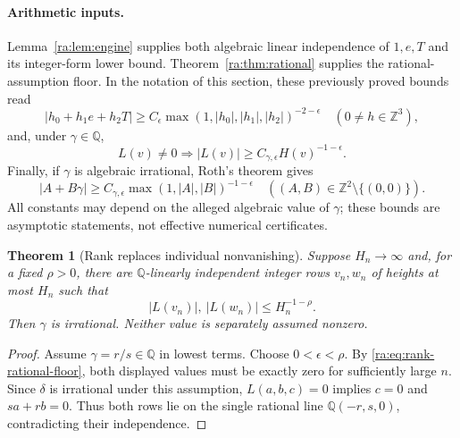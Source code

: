\documentclass[11pt,a4paper]{article}
\newcommand{\Q}{\mathbb Q}
\newcommand{\Z}{\mathbb Z}
\newtheorem{theorem}{Theorem}[section]
\theoremstyle{definition}
\theoremstyle{remark}
\theoremstyle{plain}
\numberwithin{equation}{section}
\begin{document}
\paragraph{Arithmetic inputs.}
Lemma~\ref{ra:lem:engine} supplies both algebraic linear independence of
$1,e,T$ and its integer-form lower bound. Theorem~\ref{ra:thm:rational}
supplies the rational-assumption floor. In the notation of this section,
these previously proved bounds read
\begin{equation}\label{ra:eq:rank-engine}
 |h_0+h_1e+h_2T|\ge C_\epsilon
 \max(1,|h_0|,|h_1|,|h_2|)^{-2-\epsilon}
 \quad(0\ne h\in\Z^3),
\end{equation}
and, under $\gamma\in\Q$,
\begin{equation}\label{ra:eq:rank-rational-floor}
 L(v)\ne0\Longrightarrow
 |L(v)|\ge C_{\gamma,\epsilon}H(v)^{-1-\epsilon}.
\end{equation}
Finally, if $\gamma$ is algebraic irrational, Roth's
theorem \cite{Roth} gives
\begin{equation}\label{ra:eq:rank-roth}
 |A+B\gamma|\ge C_{\gamma,\epsilon}
       \max(1,|A|,|B|)^{-1-\epsilon}
 \quad ((A,B)\in\Z^2\setminus\{(0,0)\}).
\end{equation}
All constants may depend on the alleged algebraic value of $\gamma$;
these bounds are asymptotic statements, not effective numerical certificates.

\begin{theorem}[Rank replaces individual nonvanishing]
\label{ra:thm:rank-irrational}
Suppose $H_n\to\infty$ and, for a fixed $\rho>0$, there are
$\Q$-linearly independent integer rows $v_n,w_n$ of heights at most
$H_n$ such that
\[
 |L(v_n)|,\ |L(w_n)|\le H_n^{-1-\rho}.
\]
Then $\gamma$ is irrational.  Neither value is separately assumed nonzero.
\end{theorem}
\begin{proof}
Assume $\gamma=r/s\in\Q$ in lowest terms.  Choose
$0<\epsilon<\rho$.  By \eqref{ra:eq:rank-rational-floor}, both displayed
values must be exactly zero for sufficiently large $n$.  Since $\delta$
is irrational under this assumption, $L(a,b,c)=0$ implies $c=0$ and
$sa+rb=0$.  Thus both rows lie on the single rational line
$\Q(-r,s,0)$, contradicting their independence.
\end{proof}
\end{document}
